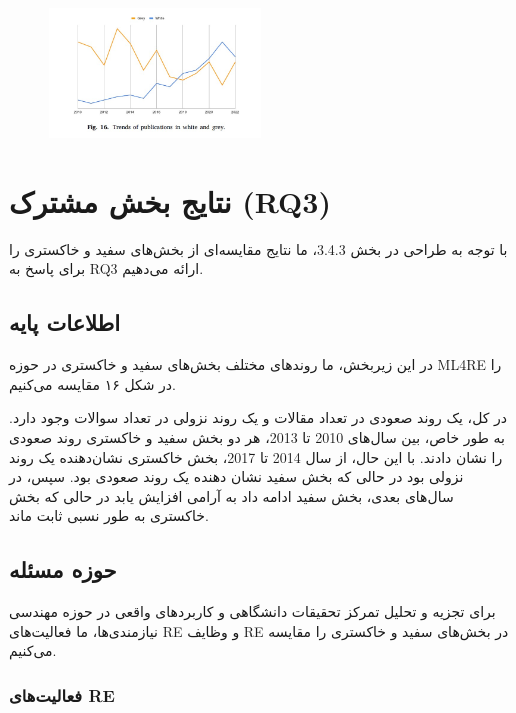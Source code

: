 \documentclass[a4paper,10pt]{article}
\begin{document}
            \begin{figure}
                \centering
                \includegraphics[width=0.5\textwidth]{Image/fig-16.jpg}
            \end{figure}
    

    \section{نتایج بخش مشترک (RQ3)}
    
        با توجه به طراحی در بخش 3.4.3، ما نتایج مقایسه‌ای از بخش‌های سفید و خاکستری را برای پاسخ به RQ3 ارائه می‌دهیم.

        \subsection{اطلاعات پایه}
        
            در این زیربخش، ما روندهای مختلف بخش‌های سفید و خاکستری در حوزه ML4RE را در شکل ۱۶ مقایسه می‌کنیم.

            در کل، یک روند صعودی در تعداد مقالات و یک روند نزولی در تعداد سوالات وجود دارد. به طور خاص، بین سال‌های 2010 تا 2013، هر دو بخش سفید و خاکستری روند صعودی را نشان دادند. با این حال، از سال 2014 تا 2017، بخش خاکستری نشان‌دهنده یک روند نزولی بود در حالی که بخش سفید نشان دهنده یک روند صعودی بود. سپس، در سال‌های بعدی، بخش سفید ادامه داد به آرامی افزایش یابد در حالی که بخش خاکستری به طور نسبی ثابت ماند.

        \subsection{حوزه مسئله}

            برای تجزیه و تحلیل تمرکز تحقیقات دانشگاهی و کاربردهای واقعی در حوزه مهندسی نیازمندی‌ها، ما فعالیت‌های RE و وظایف RE در بخش‌های سفید و خاکستری را مقایسه می‌کنیم.

            \subsubsection{فعالیت‌های RE}
\end{document}
